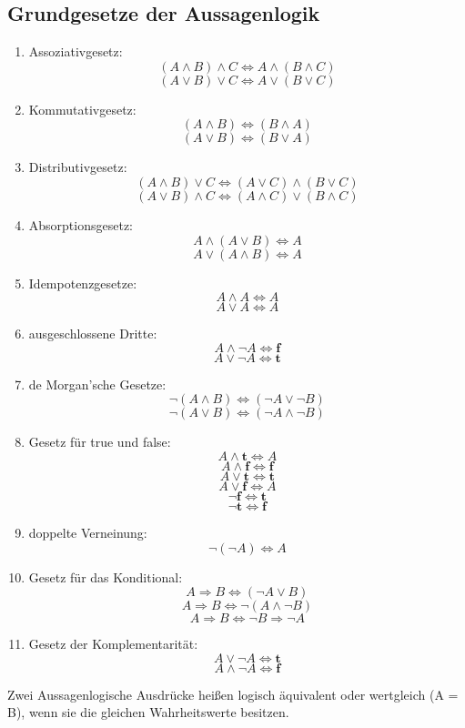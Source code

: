 \documentclass[12pt,a4paper,titlepage,draft]{article}
\begin{document}
	\subsection{Grundgesetze der Aussagenlogik}
	\begin{enumerate}
		\item Assoziativgesetz:
		\[(A \wedge B) \wedge C \Leftrightarrow A \wedge (B \wedge C)\]
		\[(A \vee B) \vee C \Leftrightarrow A \vee (B \vee C)\]
		\item Kommutativgesetz:
		\[(A \wedge B) \Leftrightarrow (B \wedge A)\]
		\[(A \vee B) \Leftrightarrow (B \vee A)\]
		\item Distributivgesetz:
		\[(A \wedge B) \vee C \Leftrightarrow (A \vee C) \wedge (B \vee C)\]
		\[(A \vee B) \wedge C \Leftrightarrow (A \wedge C) \vee (B \wedge C)\]
		\item Absorptionsgesetz:
		\[A \wedge (A \vee B) \Leftrightarrow A\]
		\[A \vee (A \wedge B) \Leftrightarrow A\]
		\item Idempotenzgesetze:
		\[A \wedge A \Leftrightarrow A\]
		\[A \vee A \Leftrightarrow A\]
		\item ausgeschlossene Dritte:
		\[A \wedge \neg A \Leftrightarrow \textbf{f}\]
		\[A \vee \neg A \Leftrightarrow \textbf{t}\]
		\item de Morgan'sche Gesetze:
		\[\neg (A \wedge B) \Leftrightarrow (\neg A \vee \neg B)\]
		\[\neg (A \vee B) \Leftrightarrow (\neg A \wedge \neg B)\]
		\item Gesetz für true und false:
		\[A \wedge \textbf{t} \Leftrightarrow A\]
		\[A \wedge \textbf{f} \Leftrightarrow \textbf{f}\]
		\[A \vee \textbf{t} \Leftrightarrow \textbf{t}\]
		\[A \vee \textbf{f} \Leftrightarrow A\]
		\[\neg \textbf{f} \Leftrightarrow \textbf{t}\]
		\[\neg \textbf{t} \Leftrightarrow \textbf{f}\]
		\item doppelte Verneinung:
		\[\neg (\neg A) \Leftrightarrow A\]
		\item Gesetz für das Konditional:
		\[A \Rightarrow B \Leftrightarrow (\neg A \vee B)\]
		\[A \Rightarrow B \Leftrightarrow \neg (A \wedge \neg B)\]
		\[A \Rightarrow B \Leftrightarrow \neg B \Rightarrow \neg A\]
		\item Gesetz der Komplementarität:
		\[A \vee \neg A \Leftrightarrow \textbf{t}\]
		\[A \wedge \neg A \Leftrightarrow \textbf{f}\]
	\end{enumerate}	
	\begin{defi}
		Zwei Aussagenlogische Ausdrücke heißen logisch äquivalent oder wertgleich (A = B), wenn sie die gleichen Wahrheitswerte besitzen.
	\end{defi}
\end{document}
